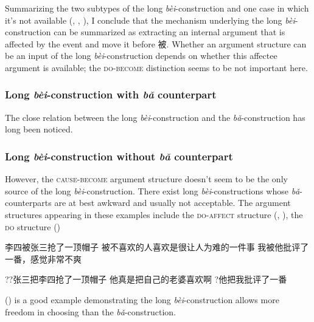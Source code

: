 \documentclass[UTF8, a4paper, oneside, scheme=plain, 12pt]{ctexrep}
\newcommand{\form}[1]{\emph{#1}}
\newcommand*{\category}[1]{\textsc{#1}}
\begin{document}
Summarizing the two subtypes of the long \form{bèi}-construction
and one case in which it's not available
(,
,
),
I conclude that the mechanism underlying the long \form{bèi}-construction
can be summarized as 
extracting an internal argument that is affected by the event 
and move it before 被.
Whether an argument structure can be an input of the long \form{bèi}-construction
depends on whether this affectee argument is available;
the \category{do}-\category{become} distinction seems to be not important here.

\subsubsection{Long \form{bèi}-construction with \form{bǎ} counterpart}
\label{sec:verb-phrase.bei.ba}

The close relation between the long \form{bèi}-construction 
and the \form{bǎ}-construction
has long been noticed.

\subsubsection{Long \form{bèi}-construction without \form{bǎ} counterpart}
\label{sec:verb-phrase.bei.no-ba}

However, the \category{cause}-\category{become} argument structure
doesn't seem to be the only source of the long \form{bèi}-construction.
There exist long \form{bèi}-constructions whose \form{bǎ}-counterparts 
are at best awkward and usually not acceptable.
The argument structures appearing in these examples 
include the \category{do}-\category{affect} structure 
(, 
),
the \category{do} structure 
()

\begin{exe}
    \ex\label{ex:verb-phrase.long-bei.no-ba.1} 李四被张三抢了一顶帽子
    \ex\label{ex:verb-phrase.long-bei.no-ba.2} 被不喜欢的人喜欢是很让人为难的一件事
    \ex 我被他批评了一番，感觉非常不爽
\end{exe}

\begin{exe}
    \ex ??张三把李四抢了一顶帽子
    \ex *他真是把自己的老婆喜欢啊
    \ex ?他把我批评了一番
\end{exe}

() is a good example 
demonstrating the long \form{bèi}-construction
allows more freedom in choosing 
than the \form{bǎ}-construction.
\end{document}
